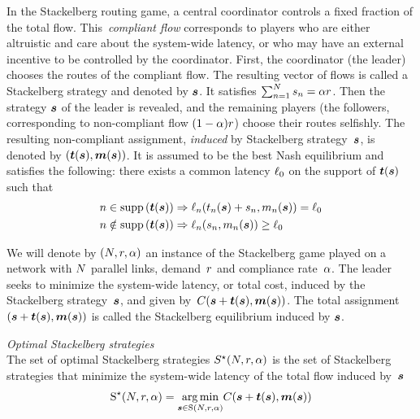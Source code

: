 In the Stackelberg routing game, a central coordinator controls a fixed fraction of the total flow. This~\emph{compliant flow} corresponds to players who are either altruistic and care about the system-wide latency, or who may have an external incentive to be controlled by the coordinator. First, the coordinator (the leader) chooses the routes of the compliant flow. The resulting vector of flows is called a Stackelberg strategy and denoted by $\boldsymbol {s}$. It satisfies $\sum_{n = 1}^N s_n = \alpha r$. Then the strategy $\boldsymbol {s}$ of the leader is revealed, and the remaining players (the followers, corresponding to non-compliant flow $(1-\alpha) r$) choose their routes selfishly. The resulting non-compliant assignment, \emph{induced} by Stackelberg strategy~$\boldsymbol {s}$, is denoted by $(\boldsymbol {t}(\boldsymbol {s}), \boldsymbol {m}(\boldsymbol {s}))$. It is assumed to be the best Nash equilibrium \cite{krichene12} and satisfies the following: there exists a common latency $\ell_0$ on the support of $\boldsymbol {t}(\boldsymbol {s})$ such that
\begin{equation}
\label{eq:induced_eq}
\begin{aligned}
n \in \textup{supp} \left( \boldsymbol {t}(\boldsymbol {s}) \right) &\Rightarrow \ell_n(t_n(\boldsymbol {s}) + s_n, m_n(\boldsymbol {s})) = \ell_0 \\
n \notin \textup{supp} \left( \boldsymbol {t}(\boldsymbol {s}) \right) &\Rightarrow \ell_n(s_n, m_n(\boldsymbol {s})) \geq \ell_0
\end{aligned}
\end{equation}

We will denote by $(N, r, \alpha)$ an instance of the Stackelberg game played on a network with $N$ parallel links, demand~$r$ and compliance rate~$\alpha$. The leader seeks to minimize the system-wide latency, or total cost, induced by the Stackelberg strategy~$\boldsymbol {s}$, and given by~$C(\boldsymbol {s} + \boldsymbol {t}(\boldsymbol {s}), \boldsymbol {m}(\boldsymbol {s}))$. The total assignment $(\boldsymbol {s} + \boldsymbol {t}(\boldsymbol {s}), \boldsymbol {m}(\boldsymbol {s}))$ is called the Stackelberg equilibrium induced by $\boldsymbol {s}$.

\begin{definition}{\emph{Optimal Stackelberg strategies}\\}
\label{def:BstStck}
The set of optimal Stackelberg strategies $S^\star(N, r, \alpha)$ is the set of Stackelberg strategies that minimize the system-wide latency of the total flow induced by~$\boldsymbol {s}$
\begin{equation}
\textup{S}^\star (N, r, \alpha) = \underset{\boldsymbol {s} \in \textup{S} (N, r, \alpha)}{\arg\min} C(\boldsymbol {s}+\boldsymbol {t}(\boldsymbol {s}), \boldsymbol {m}(\boldsymbol {s}))
\end{equation}
\end{definition}

